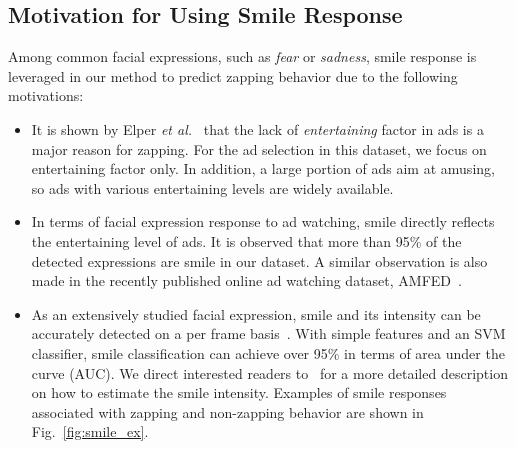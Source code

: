 \documentclass[10pt,journal,cspaper,compsoc]{IEEEtran}
\begin{document}

\subsection{Motivation for Using Smile Response}
Among common facial expressions, such as \textit{fear} or \textit{sadness}, smile response is leveraged in our method to predict zapping behavior due to the following motivations:
\begin{itemize}
\item It is shown by Elper \textit{et al.}~\cite{Elpers03} that the lack of \textit{entertaining} factor in ads is a major reason for zapping. For the ad selection in this dataset, we focus on entertaining factor only. In addition, a large portion of ads aim at amusing, so ads with various entertaining levels are widely available. 

\item In terms of facial expression response to ad watching, smile directly reflects the entertaining level of ads. It is observed that more than 95\% of the detected expressions are smile in our dataset. A similar observation is also made in the recently published online ad watching dataset, AMFED~\cite{amfed}. 

\item As an extensively studied facial expression, smile and its intensity can be accurately detected on a per frame basis~\cite{Yang_TAC14}. With simple features and an SVM classifier, smile classification can achieve over 95\% in terms of area under the curve (AUC). We direct interested readers to~\cite{Yang_TAC14} for a more detailed description on how to estimate the smile intensity. Examples of smile responses associated with zapping and non-zapping behavior are shown in Fig.~\ref{fig:smile_ex}.

\end{itemize}
\end{document}
